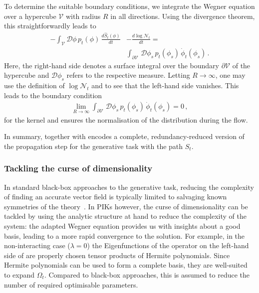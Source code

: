 \documentclass[reprint,amsmath,amssymb,aps,pra,superscriptaddress,nofootinbib,twocolumn,floatfix,nolongbibliography]{revtex4-2}
\begin{document}
To determine the suitable boundary conditions, we integrate the Wegner equation  over a hypercube $\mathcal{V}$ with radius $R$ in all directions. Using the divergence theorem, this straightforwardly leads to
%
\begin{align}
    - \int_\mathcal{V} \mathcal{D}\phi\, p_t(\phi) \, \frac{d \hat{S}_t(\phi)}{dt}  &- \frac{d \log \mathcal{N}_t}{dt} = \\[1ex]
    &\int_{\partial \mathcal{V}}\,\mathcal{D}\phi_s \,p_t(\phi_s) \, \dot{\phi}_t(\phi_s) \,. \nonumber
\end{align}
%
Here, the right-hand side denotes a surface integral over the boundary $\partial \mathcal{V}$ of the hypercube and $\mathcal{D}\phi_s$ refers to the respective measure. Letting $R \to \infty$, one may use the definition of $\log \mathcal{N}_t$ and  to see that the left-hand side vanishes. This leads to the boundary condition
%
\begin{align}
    \label{eq:BoundaryCondition}
    \lim_{R \to \infty} \int_{\partial \mathcal{V}}\,\mathcal{D}\phi_s \,p_t(\phi_s) \, \dot{\phi}_t(\phi_s) = 0\,,
\end{align}
%
for the kernel and ensures the normalisation of the distribution during the flow. 

In summary,  together with  encodes a complete, redundancy-reduced version of the propagation step for the generative task with the path $S_t$.


\subsubsection{Tackling the curse of dimensionality}
\label{sec:CurseDimensionality}

In standard black-box approaches to the generative task, reducing the complexity of finding an accurate vector field is typically limited to salvaging known symmetries of the theory~\cite{Gerdes:2022eve,Koehler:2020efe,Kanwar:2020xzo}. In PIKs however, the curse of dimensionality can be tackled by using the analytic structure at hand to reduce the complexity of the system: the adapted Wegner equation  provides us with insights about a good basis, leading to a more rapid convergence to the solution. For example, in the non-interacting case ($\lambda=0$) the Eigenfunctions of the operator on the left-hand side of  are properly chosen tensor products of Hermite polynomials. Since Hermite polynomials can be used to form a complete basis, they are well-suited to expand $\Omega_t$. Compared to black-box approaches, this is assumed to reduce the number of required optimisable parameters.
\end{document}
